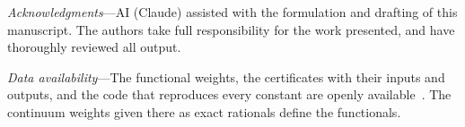 \documentclass[aps,prl,twocolumn,superscriptaddress,nofootinbib,floatfix]{revtex4-2}
\begin{document}
\textit{Acknowledgments}---AI (Claude) assisted with the formulation and drafting of this manuscript. The authors take full
responsibility for the work presented, and have thoroughly reviewed all output.

\textit{Data availability}---The functional weights, the certificates with their inputs and outputs, and the
code that reproduces every constant are openly available~\cite{Zenodo}. The continuum weights given there as exact rationals define the functionals.


\end{document}
